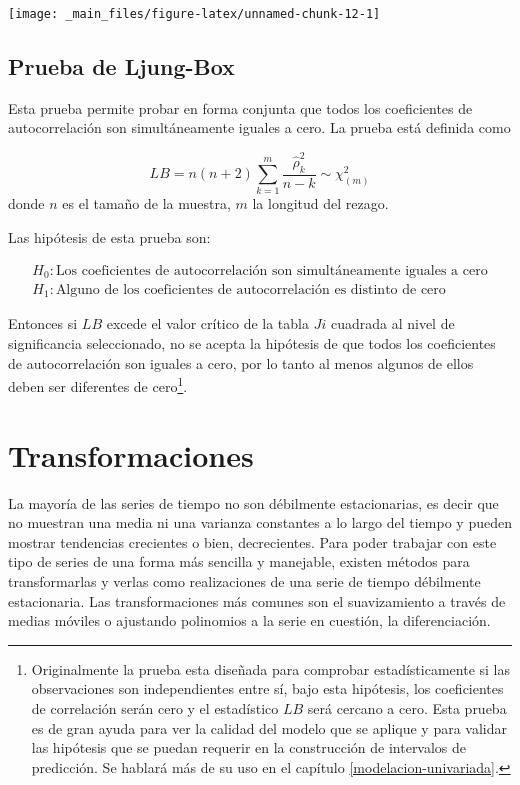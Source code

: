 \documentclass[
  a4paper,
  oneside,
  openany]{book}
\begin{document}
\begin{center}\texttt{[image: \_main\_files/figure-latex/unnamed-chunk-12-1]} \end{center}

\hypertarget{prueba-de-ljung-box}{%
\section{Prueba de Ljung-Box}\label{prueba-de-ljung-box}}

Esta prueba permite probar en forma conjunta que todos los coeficientes de autocorrelación son simultáneamente iguales a cero. La prueba está definida como

\[
LB=n(n+2)\sum_{k=1}^m\frac{\hat\rho_k^2}{n-k}\sim \chi_{(m)}^2
\]
donde \(n\) es el tamaño de la muestra, \(m\) la longitud del rezago.

Las hipótesis de esta prueba son:

\[
\begin{array}{cc}
H_0:\mbox{Los coeficientes de autocorrelación son simultáneamente iguales a cero}\\
H_1: \mbox{Alguno de los coeficientes de autocorrelación es distinto de cero}
\end{array}
\]

Entonces si \(LB\) excede el valor crítico de la tabla \(Ji\) cuadrada al nivel de significancia seleccionado, no se acepta la hipótesis de que todos los coeficientes de autocorrelación son iguales a cero, por lo tanto al menos algunos de ellos deben ser diferentes de cero\footnote{Originalmente la prueba esta diseñada para comprobar estadísticamente si las observaciones son independientes entre sí, bajo esta hipótesis, los coeficientes de correlación serán cero y el estadístico \(LB\) será cercano a cero. Esta prueba es de gran ayuda para ver la calidad del modelo que se aplique y para validar las hipótesis que se puedan requerir en la construcción de intervalos de predicción. Se hablará más de su uso en el capítulo \ref{modelacion-univariada}.}.

\hypertarget{transformaciones}{%
\chapter{Transformaciones}\label{transformaciones}}

La mayoría de las series de tiempo no son débilmente estacionarias, es decir que no muestran una media ni una varianza constantes a lo largo del tiempo y pueden mostrar tendencias crecientes o bien, decrecientes. Para poder trabajar con este tipo de series de una forma más sencilla y manejable, existen métodos para transformarlas y verlas como realizaciones de una serie de tiempo débilmente estacionaria. Las transformaciones más comunes son el suavizamiento a través de medias móviles o ajustando polinomios a la serie en cuestión, la diferenciación.
\end{document}
